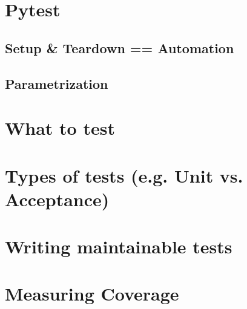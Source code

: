 \section{Pytest}
\subsection{Setup \& Teardown == Automation}
\subsection{Parametrization}

\section{What to test}
\section{Types of tests (e.g. Unit vs. Acceptance)}
\section{Writing maintainable tests}
\section{Measuring Coverage}